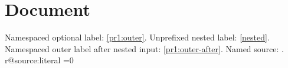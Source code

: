 \documentclass{article}
\begin{document}
\section{Document}
Namespaced optional label: \cref{pr1:outer}.
Unprefixed nested label: \cref{nested}.
Namespaced outer label after nested input: \cref{pr1:outer-after}.
Named source: .
\ifcsname r@source:literal\endcsname
  \ifnum{}=0\else
    \PackageError{named-reference}{Object reference retained another heading's name}{}\fi
\fi
\end{document}
